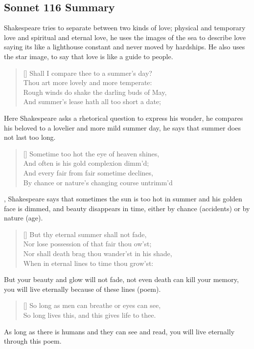 \documentclass[12pt, a4paper]{article}
\begin{document}
\subsection*{Sonnet 116 Summary}

Shakespeare tries to separate between two kinds of love;
physical and temporary love and spiritual
and eternal love, he uses the images of the sea to describe love
saying its like a lighthouse constant and never moved by hardships.
He also uses the star image, to say that love is like a guide to people.

\settowidth{\versewidth}{Shall I compare thee to a summer’s day?}
\begin{verse}[\versewidth]
{\fontverse
Shall I compare thee to a summer’s day?\\
Thou art more lovely and more temperate: \\
Rough winds do shake the darling buds of May, \\
And summer’s lease hath all too short a date; 
}
\end{verse}
{\fontpar
Here Shakespeare asks a rhetorical question to 
express his wonder, he compares his beloved to a lovelier and
more mild summer day, he says that summer does not last too long.
}

\begin{verse}[\versewidth]
{\fontverse
Sometime too hot the eye of heaven shines, \\
And often is his gold complexion dimm'd; \\
And every fair from fair sometime declines, \\
By chance or nature’s changing course untrimm'd
}
\end{verse}

{\fontpar
{}, Shakespeare says that sometimes
the sun is too hot in summer and his golden face is dimmed,
and beauty disappears in time, either by chance (accidents) or by
nature (age).
}

\begin{verse}[\versewidth]
{\fontverse
But thy eternal summer shall not fade, \\
Nor lose possession of that fair thou ow’st; \\
Nor shall death brag thou wander’st in his shade, \\
When in eternal lines to time thou grow’st:
}
\end{verse}
{\fontpar
But your beauty and glow will not fade, not even death can
kill your memory, you will live eternally because of these
lines (poem).
}
\begin{verse}[\versewidth]
{\fontverse
So long as men can breathe or eyes can see,\\
So long lives this, and this gives life to thee.
}
\end{verse}
{\fontpar
As long as there is humans and they can see and read,
you will live eternally through this poem.
}
\end{document}
